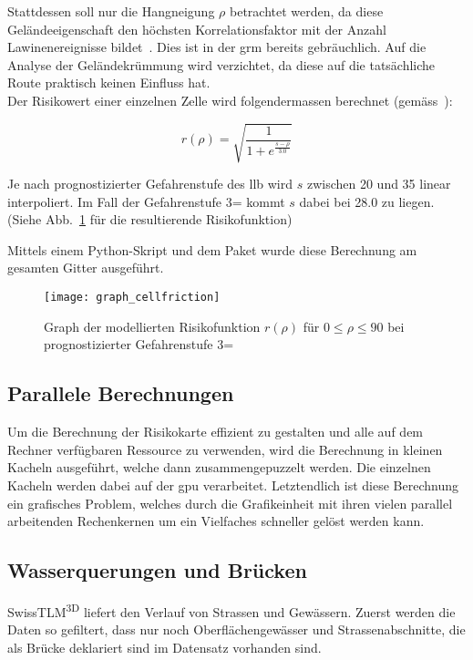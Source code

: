 Stattdessen soll nur die Hangneigung $\rho$ betrachtet werden, da diese Geländeeigenschaft den höchsten Korrelationsfaktor mit der Anzahl Lawinenereignisse bildet~\cite{arpddatasetdocs}. Dies ist in der \gls{grm} bereits gebräuchlich. Auf die Analyse der Geländekrümmung wird verzichtet, da diese auf die tatsächliche Route praktisch keinen Einfluss hat.\\
Der Risikowert einer einzelnen Zelle wird folgendermassen berechnet (gemäss~\citeauthor{sacbergspwinterp99})\cite{sacbergspwinterp99}:

\[
r(\rho) = \sqrt{\frac{1}{1 + e^{\frac{s-\rho}{3.0}}}}
\]

Je nach prognostizierter Gefahrenstufe des \gls{llb} wird $s$ zwischen 20 und 35 linear interpoliert. Im Fall der Gefahrenstufe 3= kommt $s$ dabei bei 28.0 zu liegen. (Siehe Abb.~\ref{fig:graph} für die resultierende Risikofunktion)

Mittels einem Python-Skript und dem Paket  wurde diese Berechnung am gesamten Gitter ausgeführt.

\begin{figure}[H]
  \centering
  \texttt{[image: graph\_cellfriction]}
  \caption{Graph der modellierten Risikofunktion $r(\rho)$ für $0 \leq \rho \leq 90$ bei prognostizierter Gefahrenstufe 3=}\label{fig:graph}
\end{figure}

\subsection{Parallele Berechnungen}

Um die Berechnung der Risikokarte effizient zu gestalten und alle auf dem Rechner verfügbaren Ressource zu verwenden, wird die Berechnung in kleinen Kacheln ausgeführt, welche dann zusammengepuzzelt werden. Die einzelnen Kacheln werden dabei auf der \acrshort{gpu} verarbeitet. Letztendlich ist diese Berechnung ein grafisches Problem, welches durch die Grafikeinheit mit ihren vielen parallel arbeitenden Rechenkernen um ein Vielfaches schneller gelöst werden kann.

\subsection{Wasserquerungen und Brücken}

SwissTLM\textsuperscript{3D} liefert den Verlauf von Strassen und Gewässern. Zuerst werden die Daten so gefiltert, dass nur noch Oberflächengewässer und Strassenabschnitte, die als Brücke deklariert sind im Datensatz vorhanden sind.

